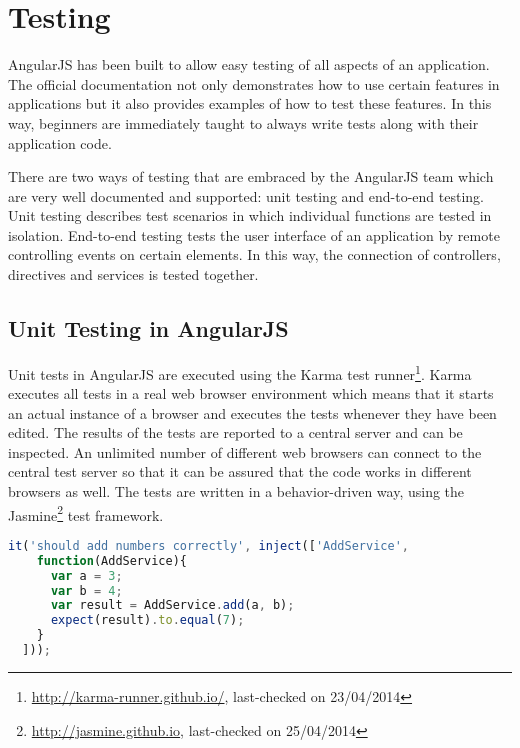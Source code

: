 \section{Testing}

AngularJS has been built to allow easy testing of all aspects of an application. The official documentation not only demonstrates how to use certain features in applications but it also provides examples of how to test these features. In this way, beginners are immediately taught to always write tests along with their application code. 

There are two ways of testing that are embraced by the AngularJS team which are very well documented and supported: unit testing and end-to-end testing. Unit testing describes test scenarios in which individual functions are tested in isolation. End-to-end testing tests the user interface of an application by remote controlling events on certain elements. In this way, the connection of controllers, directives and services is tested together. \cite[chapter: Two types of tests in AngularJS (plus one more)]{niemla2013testing}

\subsection{Unit Testing in AngularJS}

Unit tests in AngularJS are executed using the Karma test runner\footnote{\url{http://karma-runner.github.io/}, last-checked on 23/04/2014}. Karma executes all tests in a real web browser environment which means that it starts an actual instance of a browser and executes the tests whenever they have been edited. The results of the tests are reported to a central server and can be inspected. An unlimited number of different web browsers can connect to the central test server so that it can be assured that the code works in different browsers as well.
The tests are written in a behavior-driven way, using the Jasmine\footnote{\url{http://jasmine.github.io}, last-checked on 25/04/2014} test framework.

\begin{lstlisting}[language=JavaScript, caption=Testing a service, label=lst:testing-service]
  it('should add numbers correctly', inject(['AddService',
    function(AddService){
      var a = 3;
      var b = 4;
      var result = AddService.add(a, b);
      expect(result).to.equal(7);
    }
  ]));
\end{lstlisting}


